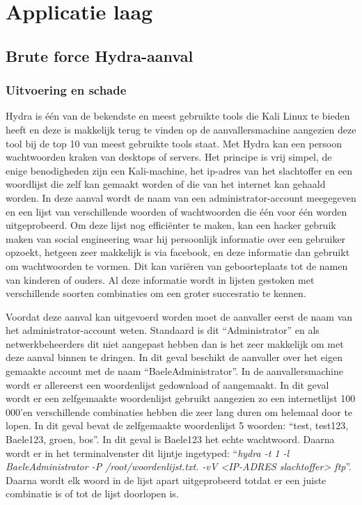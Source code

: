 \documentclass[pdftex,a4paper,12pt]{report}
\begin{document}
\section{Applicatie laag}
\subsection{Brute force Hydra-aanval}
\subsubsection{Uitvoering en schade}
Hydra is één van de bekendste en meest gebruikte tools die Kali Linux te bieden heeft en deze is makkelijk terug te vinden op de aanvallersmachine aangezien deze tool bij de top 10 van meest gebruikte tools staat. Met Hydra kan een persoon wachtwoorden kraken van desktops of servers. Het principe is vrij simpel, de enige benodigheden zijn een Kali-machine, het ip-adres van het slachtoffer en een woordlijst die zelf kan gemaakt worden of die van het internet kan gehaald worden. In deze aanval wordt de naam van een administrator-account meegegeven en een lijst van verschillende woorden of wachtwoorden die één voor één worden uitgeprobeerd. Om deze lijst nog efficiënter te maken, kan een hacker gebruik maken van social engineering waar hij persoonlijk informatie over een gebruiker opzoekt, hetgeen zeer makkelijk is via facebook, en deze informatie dan gebruikt om wachtwoorden te vormen. Dit kan variëren van geboorteplaats tot de namen van kinderen of ouders. Al deze informatie wordt in lijsten gestoken met verschillende soorten combinaties om een groter succesratio te kennen. \citep{Wilde2013} \newline 

Voordat deze aanval kan uitgevoerd worden moet de aanvaller eerst de naam van het administrator-account weten. Standaard is dit "`Administrator"' en als netwerkbeheerders dit niet aangepast hebben dan is het zeer makkelijk om met deze aanval binnen te dringen. In dit geval beschikt de aanvaller over het eigen gemaakte account met de naam "`BaeleAdministrator"'. In de aanvallersmachine wordt er allereerst een woordenlijst gedownload of aangemaakt. In dit geval wordt er een zelfgemaakte woordenlijst gebruikt aangezien zo een internetlijst 100 000'en verschillende combinaties hebben die zeer lang duren om helemaal door te lopen. In dit geval bevat de zelfgemaakte woordenlijst 5 woorden: "`test, test123, Baele123, groen, bos"'. In dit geval is Baele123 het echte wachtwoord. Daarna wordt er in het terminalvenster dit lijntje ingetyped: "`\textit{hydra -t 1 -l BaeleAdministrator -P /root/woordenlijst.txt. -vV <IP-ADRES slachtoffer> ftp}"'. Daarna wordt elk woord in de lijst apart uitgeprobeerd totdat er een juiste combinatie is of tot de lijst doorlopen is. \citep{MoonMei} \newline 
\end{document}
